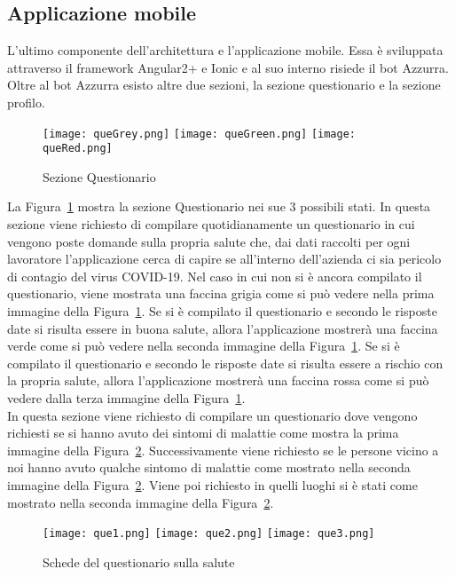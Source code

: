 \begin{trivlist}
	\item\subsection{Applicazione mobile}
	L'ultimo componente dell'architettura e l'applicazione mobile. Essa è sviluppata attraverso il framework Angular2+ e Ionic e al suo interno risiede il bot Azzurra. Oltre al bot Azzurra esisto altre due sezioni, la sezione questionario e la sezione profilo. 
	
	\begin{figure}[h]
		\centering
		\texttt{[image: queGrey.png]}\hfill
		\texttt{[image: queGreen.png]}\hfill
		\texttt{[image: queRed.png]}
		\caption{Sezione Questionario}\label{fig:que}
	\end{figure}
	
	La Figura~\ref{fig:que} mostra la sezione Questionario nei sue 3 possibili stati. In questa sezione viene richiesto di compilare quotidianamente un questionario in cui vengono poste domande sulla propria salute che, dai dati raccolti per ogni lavoratore l'applicazione cerca di capire se all'interno dell'azienda ci sia pericolo di contagio del virus COVID-19. Nel caso in cui non si è ancora compilato il questionario, viene mostrata una faccina grigia come si può vedere nella prima immagine della Figura~\ref{fig:que}. Se si è compilato il questionario e secondo le risposte date si risulta essere in buona salute, allora l'applicazione mostrerà una faccina verde come si può vedere nella seconda immagine della Figura~\ref{fig:que}. Se si è compilato il questionario e secondo le risposte date si risulta essere a rischio con la propria salute, allora l'applicazione mostrerà una faccina rossa come si può vedere dalla terza immagine della Figura~\ref{fig:que}.
	\\
	\clearpage
	In questa sezione viene richiesto di compilare un questionario dove vengono richiesti se si hanno avuto dei sintomi di malattie come mostra la prima immagine della Figura~\ref{fig:queSlide}. Successivamente viene richiesto se le persone vicino a noi hanno avuto qualche sintomo di malattie come mostrato nella seconda immagine della Figura~\ref{fig:queSlide}. Viene poi richiesto in quelli luoghi si è stati come mostrato nella seconda immagine della Figura~\ref{fig:queSlide}.
	\begin{figure}[h]
		\begin{center}
			\texttt{[image: que1.png]}
			\texttt{[image: que2.png]}
			\texttt{[image: que3.png]}
			\caption{Schede del questionario sulla salute}\label{fig:queSlide}
		\end{center}
	\end{figure}


\end{trivlist}
